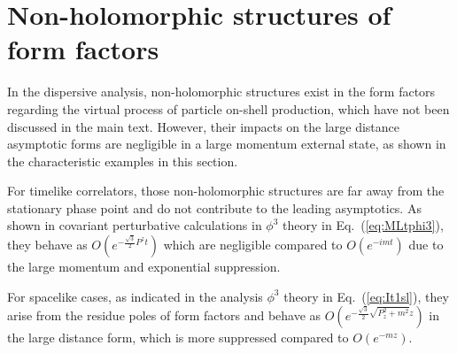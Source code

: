 \documentclass[a4paper,11pt]{article}
\begin{document}
\iffalse
\section{Non-holomorphic structures of form factors}
In the dispersive analysis, non-holomorphic structures exist in the form factors regarding the virtual process of particle on-shell production, which have not been discussed in the main text. However, their impacts on the large distance asymptotic forms are negligible in a large momentum external state, as shown in the characteristic examples in this section.  

For timelike correlators, those non-holomorphic structures are far away from the stationary phase point and do not contribute to the leading asymptotics. As shown in covariant perturbative calculations in $\phi^3$ theory in Eq.~(\ref{eq:MLtphi3}), they behave as $O\left(e^{- \frac{\sqrt{3}}{2} P^z t}\right)$ which are negligible compared to $O\left( e^{-i m t}\right)$ due to the large momentum and exponential suppression. 

For spacelike cases, as indicated in the analysis $\phi^3$ theory in Eq.~(\ref{eq:It1sl}), they arise from the residue poles of form factors and behave as $O\left(e^{-\frac{\sqrt{3}}{2} \sqrt{P_z^2+m^2} z}\right)$ in the large distance form, which is more suppressed compared to $O\left(e^{-m z}\right)$.
\end{document}
